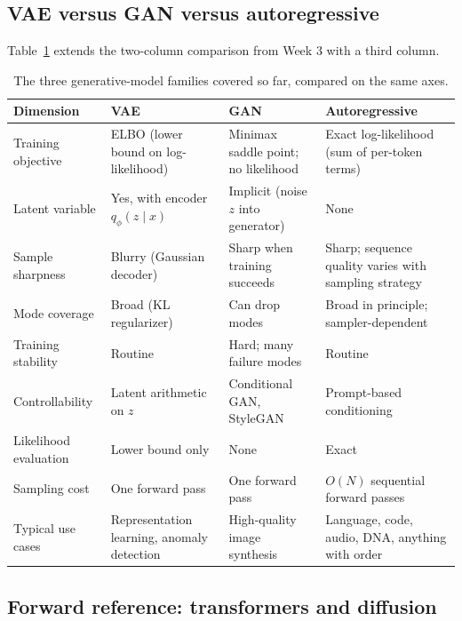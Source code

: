 \documentclass[11pt]{article}
\theoremstyle{remark}
\begin{document}
\subsection{VAE versus GAN versus autoregressive}

Table~\ref{tab:families} extends the two-column comparison from Week 3 with a third column.

\begin{table}[htbp]
\centering
\small
\setlength{\tabcolsep}{5pt}
\renewcommand{\arraystretch}{1.15}
\begin{tabular}{@{}>{\raggedright\arraybackslash}p{2.9cm}>{\raggedright\arraybackslash}p{3.5cm}>{\raggedright\arraybackslash}p{3.5cm}>{\raggedright\arraybackslash}p{4.2cm}@{}}
\toprule
\textbf{Dimension} & \textbf{VAE} & \textbf{GAN} & \textbf{Autoregressive} \\
\midrule
Training objective & ELBO (lower bound on log-likelihood) & Minimax saddle point; no likelihood & Exact log-likelihood (sum of per-token terms) \\
Latent variable & Yes, with encoder $q_\phi(z \mid x)$ & Implicit (noise $z$ into generator) & None \\
Sample sharpness & Blurry (Gaussian decoder) & Sharp when training succeeds & Sharp; sequence quality varies with sampling strategy \\
Mode coverage & Broad (KL regularizer) & Can drop modes & Broad in principle; sampler-dependent \\
Training stability & Routine & Hard; many failure modes & Routine \\
Controllability & Latent arithmetic on $z$ & Conditional GAN, StyleGAN & Prompt-based conditioning \\
Likelihood evaluation & Lower bound only & None & Exact \\
Sampling cost & One forward pass & One forward pass & $O(N)$ sequential forward passes \\
Typical use cases & Representation learning, anomaly detection & High-quality image synthesis & Language, code, audio, DNA, anything with order \\
\bottomrule
\end{tabular}
\caption{The three generative-model families covered so far, compared on the same axes.}
\label{tab:families}
\end{table}

\subsection{Forward reference: transformers and diffusion}
\end{document}
